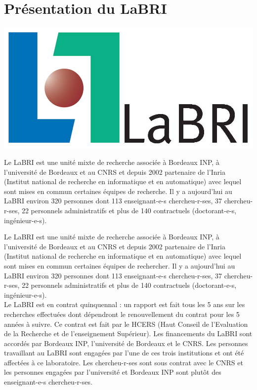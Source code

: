 \documentclass[a4paper]{article}
\begin{document}
\section{Présentation du LaBRI}
\begin{minipage}{0.4\linewidth}
\includegraphics[scale=0.5]{labri.jpeg}
\end{minipage}\hfill
\begin{minipage}{0.55\linewidth}
Le LaBRI est une unité mixte de recherche associée à Bordeaux INP, à l'université de Bordeaux et au CNRS et depuis 2002 partenaire de l'Inria (Institut national de recherche en informatique et en automatique) avec lequel sont mises en commun certaines équipes de recherche. Il y a aujourd'hui au LaBRI environ 320 personnes dont 113 enseignant-e-s chercheu-r-ses, 37 chercheu-r-ses, 22 personnels administratifs et plus de 140 contractuels (doctorant-e-s, ingénieur-e-s).\vspace{2\baselineskip}
\end{minipage}
Le LaBRI est une unité mixte de recherche associée à Bordeaux INP, à l'université de Bordeaux et au CNRS et depuis 2002 partenaire de l'Inria (Institut national de recherche en informatique et en automatique) avec lequel sont mises en commun certaines équipes de rechercher. Il y a aujourd'hui au LaBRI environ 320 personnes dont 113 enseignant-e-s chercheu-r-ses, 37 chercheu-r-ses, 22 personnels administratifs et plus de 140 contractuels (doctorant-e-s, ingénieur-e-s).\vspace{2\baselineskip}\\
Le LaBRI est en contrat quinquennal : un rapport est fait tous les 5 ans sur les recherches effectuées dont dépendront le renouvellement du contrat pour les 5 années à suivre. Ce contrat est fait par le HCERS (Haut Conseil de l'Evaluation de la Recherche et de l'enseignement Supérieur).
Les financements du LaBRI sont accordés par Bordeaux INP, l'université de Bordeaux et le CNRS. Les personnes travaillant au LaBRI sont engagées par l'une de ces trois institutions et ont été affectées à ce laboratoire. Les chercheu-r-ses sont sous contrat avec le CNRS et les personnes engagées par l'université et Bordeaux INP sont plutôt des enseignant-e-s chercheu-r-ses.\medskip\\
\end{document}
